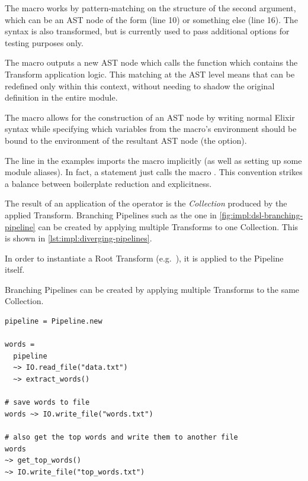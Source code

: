The \exs{~>} macro works by pattern-matching on the structure of the second argument, which can be an AST node of the form  (line 10) or something else (line 16).
The  syntax is also transformed, but is currently used to pass additional options for testing purposes only.

The macro outputs a new AST node which calls the  function which contains the Transform application logic.
This matching at the AST level means that \exs{--} can be redefined only within this context, without needing to shadow the original definition in the entire module.

The  macro allows for the construction of an AST node by writing normal Elixir syntax while specifying which variables from the macro's environment should be bound to the environment of the resultant AST node (the  option).

The  line in the examples imports the \exs{~>} macro implicitly (as well as setting up some module aliases).
In fact, a  statement just calls the  macro \cite[p.~35]{Elixir-Metaprogramming}.
This convention strikes a balance between boilerplate reduction and explicitness.

The result of an application of the \exs{~>} operator is the \emph{Collection} produced by the applied Transform.
Branching Pipelines such as the one in \cref{fig:impl:dsl-branching-pipeline} can be created by applying multiple Transforms to one Collection.
This is shown in \cref{lst:impl:diverging-pipelines}.

In order to instantiate a Root Transform (e.g.\ ), it is applied to the Pipeline itself.

\begin{listing}[h]
	\caption[An example of creating branching Pipelines through application of multiple Transforms to one Collection.]{Branching Pipelines can be created by applying multiple Transforms to the same Collection.}
	\label{lst:impl:diverging-pipelines}
	\begin{verbatim}
pipeline = Pipeline.new

words =
  pipeline
  ~> IO.read_file("data.txt")
  ~> extract_words()
  
# save words to file
words ~> IO.write_file("words.txt")

# also get the top words and write them to another file
words
~> get_top_words()
~> IO.write_file("top_words.txt")
	\end{verbatim}
\end{listing}

